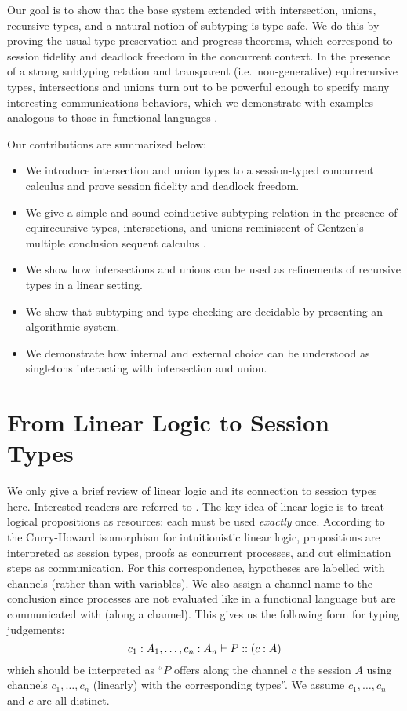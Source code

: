 \documentclass[a4paper,USenglish]{lipics-v2016}
\begin{document}
Our goal is to show that the base system extended with intersection, unions, recursive types, and a natural notion of subtyping is type-safe. We do this by proving the usual type preservation and progress theorems, which correspond to session fidelity and deadlock freedom in the concurrent context. In the presence of a strong subtyping relation and transparent (i.e.\ non-generative)  equirecursive types, intersections and unions turn out to be powerful enough to specify many interesting communications behaviors, which we demonstrate with examples analogous to those in functional languages \cite{FreemanP91,Dunfield03}.

Our contributions are summarized below:
\begin{itemize}
  \item We introduce intersection and union types to a session-typed concurrent calculus and prove session fidelity and deadlock freedom.
  \item We give a simple and sound coinductive subtyping relation in the presence of equirecursive types, intersections, and unions reminiscent of Gentzen's multiple conclusion sequent calculus \cite{Gentzen35, Girard87}.
  \item We show how intersections and unions can be used as refinements of recursive types in a linear setting.
  \item We show that subtyping and type checking are decidable by presenting an algorithmic system.
  \item We demonstrate how internal and external choice can be understood as singletons interacting with intersection and union.
\end{itemize}


\section{From Linear Logic to Session Types}
\label{base}
We only give a brief review of linear logic and its connection to session types here. Interested readers are referred to \cite{CairesP10, PfenningG15, Honda93}. The key idea of linear logic is to treat logical propositions as resources: each must be used \emph{exactly} once. According to the Curry-Howard isomorphism for intuitionistic linear logic, propositions are interpreted as session types, proofs as concurrent processes, and cut elimination steps as communication. For this correspondence, hypotheses are labelled with channels (rather than with variables). We also assign a channel name to the conclusion since processes are not evaluated like in a functional language but are communicated with (along a channel). This gives us the following form for typing judgements:
$$ c_1 : A_1, \ldots, c_n : A_n \vdash P :: (c : A)$$
which should be interpreted as ``$P$ offers along the channel $c$ the session $A$ using channels $c_1, \ldots, c_n$ (linearly) with the corresponding types''. We assume $c_1, \ldots, c_n$ and $c$ are all distinct.
\end{document}
